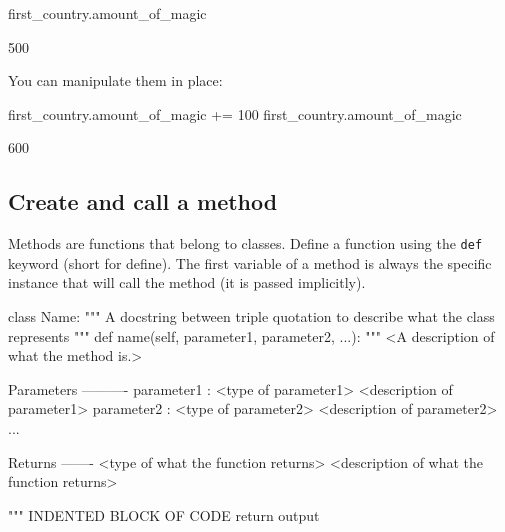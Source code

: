 \begin{pyin}
first_country.amount_of_magic
\end{pyin}





\begin{raw}
500
\end{raw}





You can manipulate them in place:




\begin{pyin}
first_country.amount_of_magic += 100
first_country.amount_of_magic
\end{pyin}





\begin{raw}
600
\end{raw}





\subsection{Create and call a method}
\label{\detokenize{building-tools/03-objects/how/main:how-to-create-and-call-a-method}}

Methods are functions that belong to classes. Define a function using the
\texttt{def} keyword (short for define). The first variable of a method is always the
specific instance that will call the method (it is passed implicitly).


\begin{api}
class Name:
    """
    A docstring between triple quotation to describe what the class represents
    """
    def name(self, parameter1, parameter2, ...):
        """
        <A description of what the method is.>

        Parameters
        ----------
        parameter1 : <type of parameter1>
            <description of parameter1>
        parameter2 : <type of parameter2>
            <description of parameter2>
        ...

        Returns
        -------
        <type of what the function returns>
            <description of what the function returns>

        """
        INDENTED BLOCK OF CODE
        return output
\end{api}



